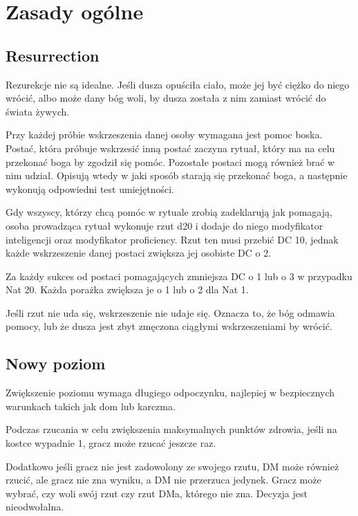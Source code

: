 \section{Zasady ogólne}
\subsection{Resurrection}

Rezurekcje nie są idealne.	Jeśli dusza opuściła ciało, może jej być  ciężko  do
niego wrócić, albo może dany bóg woli, by dusza została z nim zamiast wrócić  do
świata żywych.

Przy każdej próbie wskrzeszenia danej osoby wymagana jest pomoc boska.	 Postać,
która próbuje wskrzesić inną postać zaczyna rytuał, który ma na  celu  przekonać
boga by zgodził się pomóc.	Pozostałe postaci mogą również brać  w	nim  udział.
Opisują wtedy w jaki sposób starają się przekonać  boga,  a  następnie	wykonują
odpowiedni test umiejętności.

Gdy wszyscy, którzy chcą pomóc w rytuale zrobią zadeklarują jak pomagają,  osoba
prowadząca rytuał wykonuje rzut d20 i dodaje do niego  modyfikator	inteligencji
oraz modyfikator proficiency.	Rzut  ten  musi  przebić  DC  10,  jednak  każde
wskrzeszenie	danej	 postaci	zwiększa	jej    osobiste    DC	 o	  2.

Za każdy sukces od postaci pomagających zmniejsza DC o 1 lub  o  3	w  przypadku
Nat  20.   Każda  porażka	zwiększa   je	o	1	lub   o   2   dla	Nat   1.

Jeśli rzut nie uda się, wskrzeszenie nie udaje się.  Oznacza to, że bóg  odmawia
pomocy, lub że dusza jest  zbyt  zmęczona  ciągłymi  wskrzeszeniami  by  wrócić.

\subsection{Nowy poziom}
Zwiększenie poziomu wymaga długiego odpoczynku, najlepiej w bezpiecznych
warunkach takich jak dom lub karczma.

Podczas rzucania w celu zwiększenia maksymalnych punktów zdrowia, jeśli na
kostce wypadnie 1, gracz może rzucać jeszcze raz.

Dodatkowo jeśli gracz nie jest zadowolony ze swojego rzutu, DM może również
rzucić, ale gracz nie zna wyniku, a DM nie przerzuca jedynek. Gracz może wybrać,
czy woli swój rzut czy rzut DMa, którego nie zna. Decyzja jest nieodwołalna.
